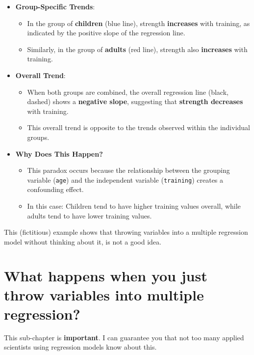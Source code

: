 \documentclass[
]{book}
\providecommand{\tightlist}{%
  \setlength{\itemsep}{0pt}\setlength{\parskip}{0pt}}
\begin{document}
\begin{itemize}
\tightlist
\item
  \textbf{Group-Specific Trends}:

  \begin{itemize}
  \tightlist
  \item
    In the group of \textbf{children} (blue line), strength \textbf{increases} with training, as indicated by the positive slope of the regression line.
  \item
    Similarly, in the group of \textbf{adults} (red line), strength also \textbf{increases} with training.
  \end{itemize}
\item
  \textbf{Overall Trend}:

  \begin{itemize}
  \tightlist
  \item
    When both groups are combined, the overall regression line (black, dashed) shows a \textbf{negative slope}, suggesting that \textbf{strength decreases} with training.
  \item
    This overall trend is opposite to the trends observed within the individual groups.
  \end{itemize}
\item
  \textbf{Why Does This Happen?}

  \begin{itemize}
  \tightlist
  \item
    This paradox occurs because the relationship between the grouping variable (\texttt{age}) and the independent variable (\texttt{training}) creates a confounding effect.
  \item
    In this case: Children tend to have higher training values overall,
    while adults tend to have lower training values.
  \end{itemize}
\end{itemize}

This (fictitious) example shows that throwing variables into a multiple regression
model without thinking about it, is not a good idea.

\section{What happens when you just throw variables into multiple regression?}\label{throwing_variables}

This sub-chapter is \textbf{important}. I can guarantee you that not too many applied
scientists using regression models know about this.
\end{document}
